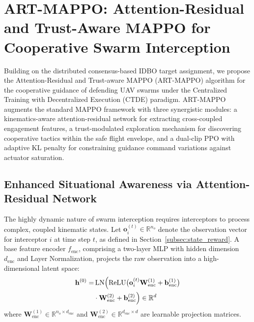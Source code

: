 \documentclass[lettersize,journal]{IEEEtran}
\begin{document}
\section{ART-MAPPO: Attention-Residual and Trust-Aware MAPPO for Cooperative Swarm Interception}
\label{sec:cooperative_algorithm}

Building on the distributed consensus-based IDBO target assignment, we propose the Attention-Residual and Trust-aware MAPPO (ART-MAPPO) algorithm for the cooperative guidance of defending UAV swarms under the Centralized Training with Decentralized Execution (CTDE) paradigm. ART-MAPPO augments the standard MAPPO framework with three synergistic modules: a kinematics-aware attention-residual network for extracting cross-coupled engagement features, a trust-modulated exploration mechanism for discovering cooperative tactics within the safe flight envelope, and a dual-clip PPO with adaptive KL penalty for constraining guidance command variations against actuator saturation.

\subsection{Enhanced Situational Awareness via Attention-Residual Network}
\label{subsec:attention_residual}

The highly dynamic nature of swarm interception requires interceptors to process complex, coupled kinematic states. Let $\mathbf{o}_i^{(t)} \in \mathbb{R}^{n_o}$ denote the observation vector for interceptor $i$ at time step $t$, as defined in Section~\ref{subsec:state_reward}. A base feature encoder $f_{\mathrm{enc}}$, comprising a two-layer MLP with hidden dimension $d_{\mathrm{enc}}$ and Layer Normalization, projects the raw observation into a high-dimensional latent space:
\begin{equation}
\label{eq:encoder}
\begin{split}
\mathbf{h}^{(0)} =& \operatorname{LN}\Bigl(\operatorname{ReLU}\bigl(\mathbf{o}_i^{(t)}\mathbf{W}_{\mathrm{enc}}^{(1)} + \mathbf{b}_{\mathrm{enc}}^{(1)}\bigr) \\
&\cdot \mathbf{W}_{\mathrm{enc}}^{(2)} + \mathbf{b}_{\mathrm{enc}}^{(2)}\Bigr) \in \mathbb{R}^{d}
\end{split}
\end{equation}
where $\mathbf{W}_{\mathrm{enc}}^{(1)} \in \mathbb{R}^{n_o \times d_{\mathrm{enc}}}$ and $\mathbf{W}_{\mathrm{enc}}^{(2)} \in \mathbb{R}^{d_{\mathrm{enc}} \times d}$ are learnable projection matrices.
\end{document}
